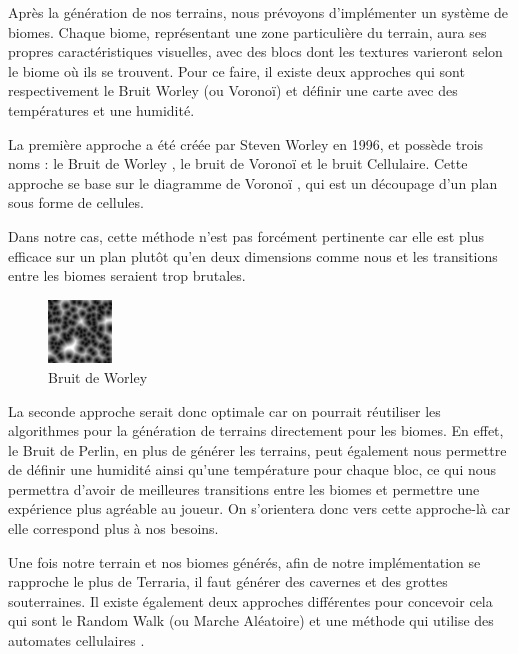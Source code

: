 \documentclass[12pt]{article}
\begin{document}
Après la génération de nos terrains, nous prévoyons d'implémenter un système de biomes. Chaque biome, représentant une zone particulière du terrain, aura ses propres caractéristiques visuelles, avec des blocs dont les textures varieront selon le biome où ils se trouvent. Pour ce faire, il existe deux approches qui sont respectivement le Bruit Worley (ou Voronoï) et définir une carte avec des températures et une humidité.\par
La première approche a été créée par Steven Worley en 1996, et possède trois noms : le Bruit de Worley \cite{worley_noise}, le bruit de Voronoï et le bruit Cellulaire. Cette approche se base sur le diagramme de Voronoï \cite{voronoi_diagram}, qui est un découpage d'un plan sous forme de cellules.\par



Dans notre cas, cette méthode n'est pas forcément pertinente car elle est plus efficace sur un plan plutôt qu'en deux dimensions comme nous et les transitions entre les biomes seraient trop brutales.\par
\begin{figure}
  \centering
  \includegraphics[width=0.15\textwidth]{assets/Worley.jpg}
  \caption{Bruit de Worley}
  \label{worley}
\end{figure}

La seconde approche serait donc optimale car on pourrait réutiliser les algorithmes pour la génération de terrains directement pour les biomes. En effet, le Bruit de Perlin, en plus de générer les terrains, peut également nous permettre de définir une humidité ainsi qu'une température pour chaque bloc, ce qui nous permettra d'avoir de meilleures transitions entre les biomes et permettre une expérience plus agréable au joueur. On s'orientera donc vers cette approche-là car elle correspond plus à nos besoins.
\par
Une fois notre terrain et nos biomes générés, afin de notre implémentation se rapproche le plus de Terraria, il faut générer des cavernes et des grottes souterraines. Il existe également deux approches différentes pour concevoir cela qui sont le Random Walk \cite{random_walk} (ou Marche Aléatoire) et une méthode qui utilise des automates cellulaires \cite{automate_cellulaire}.\par
\vspace{1cm}
\end{document}
